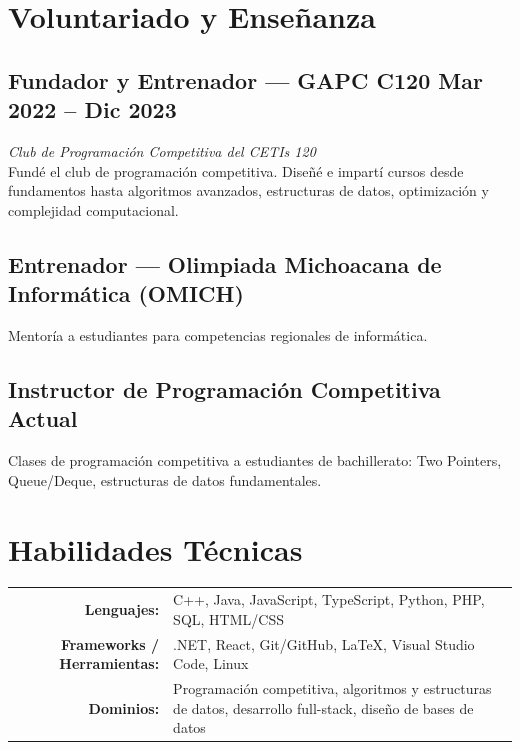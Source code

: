 \documentclass[11pt, a4paper]{article}
\begin{document}
\section{Voluntariado y Enseñanza}

\subsection[GAPC]{Fundador y Entrenador --- GAPC C120 \hfill \textnormal{\footnotesize\color{secondary}Mar 2022 -- Dic 2023}}
\vspace{0.1em}
{\small\textit{\color{secondary}Club de Programación Competitiva del CETIs 120}}\\[3pt]
{\footnotesize Fundé el club de programación competitiva. Diseñé e impartí cursos desde fundamentos hasta algoritmos avanzados, estructuras de datos, optimización y complejidad computacional.}

\subsection[OMICH]{Entrenador --- Olimpiada Michoacana de Informática (OMICH)}
\vspace{0.1em}
{\footnotesize Mentoría a estudiantes para competencias regionales de informática.}

\subsection[Instructor]{Instructor de Programación Competitiva \hfill \textnormal{\footnotesize\color{secondary}Actual}}
\vspace{0.1em}
{\footnotesize Clases de programación competitiva a estudiantes de bachillerato: Two Pointers, Queue/Deque, estructuras de datos fundamentales.}

\section{Habilidades Técnicas}

\vspace{0.2em}
{\footnotesize
\begin{tabularx}{\textwidth}{@{}r X@{}}
    \textbf{Lenguajes:} & C++, Java, JavaScript, TypeScript, Python, PHP, SQL, HTML/CSS \\[2pt]
    \textbf{Frameworks / Herramientas:} & .NET, React, Git/GitHub, \LaTeX, Visual Studio Code, Linux \\[2pt]
    \textbf{Dominios:} & Programación competitiva, algoritmos y estructuras de datos, desarrollo full-stack, diseño de bases de datos
\end{tabularx}
}
\end{document}
